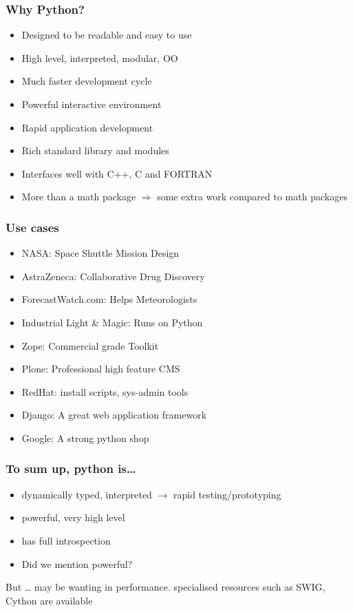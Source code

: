 \documentclass[14pt,compress]{beamer}
\newcounter{time}
\newcommand{\inctime}[1]{\addtocounter{time}{#1}{\tiny \thetime\ m}}
\begin{document}
\begin{frame}
  \frametitle{Why Python?}
  \begin{itemize}
  \item Designed to be readable and easy to use
  \item High level, interpreted, modular, OO
  \item Much faster development cycle
  \item Powerful interactive environment
  \item Rapid application development
  \item Rich standard library and modules
  \item Interfaces well with C++, C and FORTRAN
  \item \alert{More than a math package $\Rightarrow$ some extra work compared to math packages}
  \end{itemize}
\end{frame}

\begin{frame}
  \frametitle{Use cases}
  \begin{itemize}
  \item NASA: Space Shuttle Mission Design
  \item AstraZeneca: Collaborative Drug Discovery
  \item ForecastWatch.com: Helps Meteorologists
  \item Industrial Light \& Magic: Runs on Python
  \item Zope: Commercial grade Toolkit
  \item Plone: Professional high feature CMS
  \item RedHat: install scripts, sys-admin tools
  \item Django: A great web application framework
  \item Google: A strong python shop
  \end{itemize}
\end{frame}

\begin{frame}
  \frametitle{To sum up, python is\ldots}
  \begin{itemize}
  \item dynamically typed, interpreted $\rightarrow$ rapid testing/prototyping
  \item powerful, very high level
  \item has full introspection 
  \item Did we mention powerful?
  \end{itemize}
  \begin{block}{But \ldots}
    may be wanting in performance. specialised resources such as SWIG, \alert{Cython} are available 
  \end{block}
  \inctime{15}
\end{frame}
\end{document}
